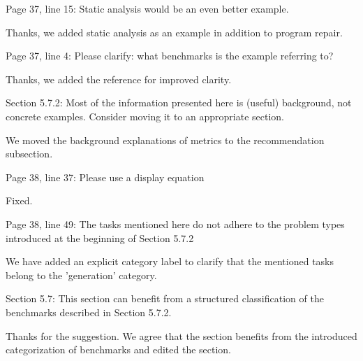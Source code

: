 \documentclass[12pt,english]{reviewresponse}
\begin{document}
\begin{revcomment}
Page 37, line 15: Static analysis would be an even better example.
\end{revcomment}
\begin{revresponse}
    Thanks, we added static analysis as an example in addition to program repair.
\end{revresponse}

\begin{revcomment}
Page 37, line 4: Please clarify: what benchmarks is the example referring to?
\end{revcomment}
\begin{revresponse}
    Thanks, we added the reference for improved clarity.
\end{revresponse}

\begin{revcomment}
Section 5.7.2: Most of the information presented here is (useful) background, not concrete examples. Consider moving it to an appropriate section.
\end{revcomment}
\begin{revresponse}
    We moved the background explanations of  metrics to the recommendation subsection.
\end{revresponse}

\begin{revcomment}
Page 38, line 37: Please use a display equation
\end{revcomment}
\begin{revresponse}
    Fixed.
\end{revresponse}

\begin{revcomment}
Page 38, line 49: The tasks mentioned here do not adhere to the problem types introduced at the beginning of Section 5.7.2
\end{revcomment}
\begin{revresponse}
    We have added an explicit category label to clarify that the mentioned tasks belong to the 'generation' category.
\end{revresponse}

\begin{revcomment}
Section 5.7: This section can benefit from a structured classification of the benchmarks described in Section 5.7.2.
\end{revcomment}
\begin{revresponse}
    Thanks for the suggestion. We agree that the section benefits from the introduced categorization of benchmarks and edited the section.
\end{revresponse}
\end{document}
